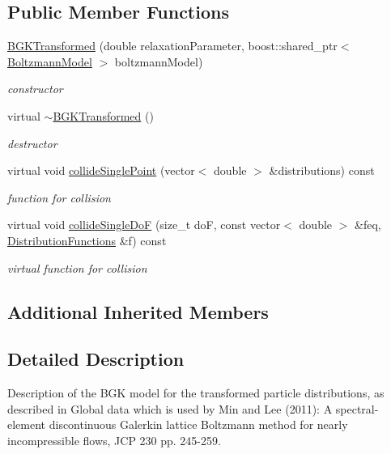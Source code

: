 \subsection*{Public Member Functions}
\begin{DoxyCompactItemize}
\item 
\hyperlink{classnatrium_1_1BGKTransformed_aafd0ed5b888da93e496c0a29e092bf5b}{B\-G\-K\-Transformed} (double relaxation\-Parameter, boost\-::shared\-\_\-ptr$<$ \hyperlink{classnatrium_1_1BoltzmannModel}{Boltzmann\-Model} $>$ boltzmann\-Model)
\begin{DoxyCompactList}\small\item\em constructor \end{DoxyCompactList}\item 
\hypertarget{classnatrium_1_1BGKTransformed_a554c68facfbd2b126f24504f215eb193}{virtual \hyperlink{classnatrium_1_1BGKTransformed_a554c68facfbd2b126f24504f215eb193}{$\sim$\-B\-G\-K\-Transformed} ()}\label{classnatrium_1_1BGKTransformed_a554c68facfbd2b126f24504f215eb193}

\begin{DoxyCompactList}\small\item\em destructor \end{DoxyCompactList}\item 
virtual void \hyperlink{classnatrium_1_1BGKTransformed_a2e40159e5f5204431b1acb84b15910c0}{collide\-Single\-Point} (vector$<$ double $>$ \&distributions) const 
\begin{DoxyCompactList}\small\item\em function for collision \end{DoxyCompactList}\item 
virtual void \hyperlink{classnatrium_1_1BGKTransformed_a6bb41acd37234d2f92a9d868ff2486e1}{collide\-Single\-Do\-F} (size\-\_\-t do\-F, const vector$<$ double $>$ \&feq, \hyperlink{classnatrium_1_1DistributionFunctions}{Distribution\-Functions} \&f) const 
\begin{DoxyCompactList}\small\item\em virtual function for collision \end{DoxyCompactList}\end{DoxyCompactItemize}
\subsection*{Additional Inherited Members}


\subsection{Detailed Description}
Description of the B\-G\-K model for the transformed particle distributions, as described in Global data which is used by Min and Lee (2011)\-: A spectral-\/element discontinuous Galerkin lattice Boltzmann method for nearly incompressible flows, J\-C\-P 230 pp. 245-\/259. 


